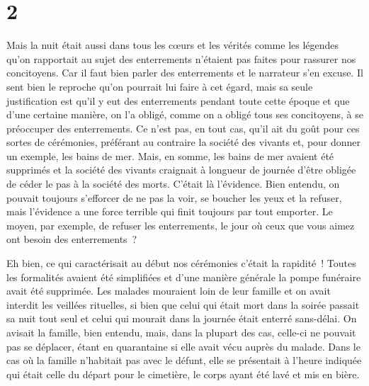 \documentclass[french,twoside]{book} %
\begin{document}
\section[{2}]{2}
\noindent Mais la nuit était aussi dans tous les cœurs et les vérités comme les légendes qu’on rapportait au sujet des enterrements n’étaient pas faites pour rassurer nos concitoyens. Car il faut bien parler des enterrements et le narrateur s’en excuse. Il sent bien le reproche qu’on pourrait lui faire à cet égard, mais sa seule justification est qu’il y eut des enterrements pendant toute cette époque et que d’une certaine manière, on l’a obligé, comme on a obligé tous ses concitoyens, à se préoccuper des enterrements. Ce n’est pas, en tout cas, qu’il ait du goût pour ces sortes de cérémonies, préférant au contraire la société des vivants et, pour donner un exemple, les bains de mer. Mais, en somme, les bains de mer avaient été supprimés et la société des vivants craignait à longueur de journée d’être obligée de céder le pas à la société des morts. C’était là l’évidence. Bien entendu, on pouvait toujours s’efforcer de ne pas la voir, se boucher les yeux et la refuser, mais l’évidence a une force terrible qui finit toujours par tout emporter. Le moyen, par exemple, de refuser les enterrements, le jour où ceux que vous aimez ont besoin des enterrements ?\par
Eh bien, ce qui caractérisait au début nos cérémonies c’était la rapidité ! Toutes les formalités avaient été simplifiées et d’une manière générale la pompe funéraire avait été supprimée. Les malades mouraient loin de leur famille et on avait interdit les veillées rituelles, si bien que celui qui était mort dans la soirée passait sa nuit tout seul et celui qui mourait dans la journée était enterré sans-délai. On avisait la famille, bien entendu, mais, dans la plupart des cas, celle-ci ne pouvait pas se déplacer, étant en quarantaine si elle avait vécu auprès du malade. Dans le cas où la famille n’habitait pas avec le défunt, elle se présentait à l’heure indiquée qui était celle du départ pour le cimetière, le corps ayant été lavé et mis en bière.\par
\end{document}
